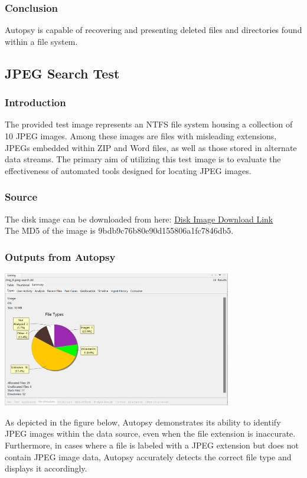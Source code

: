 \documentclass{extarticle}
\begin{document}
\subsubsection*{Conclusion}
Autopsy is capable of recovering and presenting deleted files and directories found within a file system.

\subsection{JPEG Search Test}
\subsubsection*{Introduction}
The provided test image represents an NTFS file system housing a collection of 10 JPEG images. Among these images are files with misleading extensions, JPEGs embedded within ZIP and Word files, as well as those stored in alternate data streams. The primary aim of utilizing this test image is to evaluate the effectiveness of automated tools designed for locating JPEG images.
\subsubsection*{Source}
The disk image can be downloaded from here: \href{http://prdownloads.sourceforge.net/dftt/8-jpeg-search.zip?download}{Disk Image Download Link} \\
The MD5 of the image is 9bdb9c76b80e90d155806a1fc7846db5.

\subsubsection*{Outputs from Autopsy}
\begin{center}
    \includegraphics[width=0.75\textwidth]{6/6.4/Autopsy JPEG Search Summary.png}
\end{center}
As depicted in the figure below, Autopsy demonstrates its ability to identify JPEG images within the data source, even when the file extension is inaccurate. Furthermore, in cases where a file is labeled with a JPEG extension but does not contain JPEG image data, Autopsy accurately detects the correct file type and displays it accordingly.
\end{document}
